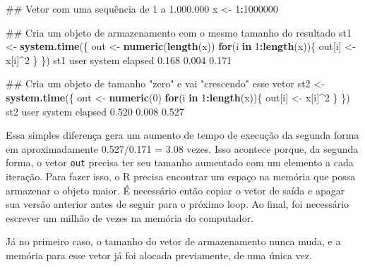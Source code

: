 \documentclass[10pt,a4paper]{book}
\newenvironment{Shaded}{\begin{snugshade}}{\end{snugshade}}
\newcommand{\KeywordTok}[1]{\textcolor[rgb]{0.13,0.29,0.53}{\textbf{#1}}}
\newcommand{\DecValTok}[1]{\textcolor[rgb]{0.00,0.00,0.81}{#1}}
\newcommand{\FloatTok}[1]{\textcolor[rgb]{0.00,0.00,0.81}{#1}}
\newcommand{\StringTok}[1]{\textcolor[rgb]{0.31,0.60,0.02}{#1}}
\newcommand{\ControlFlowTok}[1]{\textcolor[rgb]{0.13,0.29,0.53}{\textbf{#1}}}
\newcommand{\OperatorTok}[1]{\textcolor[rgb]{0.81,0.36,0.00}{\textbf{#1}}}
\newcommand{\NormalTok}[1]{#1}
\begin{document}
\begin{Shaded}
\begin{Highlighting}[]
\NormalTok{## Vetor com uma sequência de 1 a 1.000.000}
\NormalTok{x <-}\StringTok{ }\DecValTok{1}\OperatorTok{:}\DecValTok{1000000}

\NormalTok{## Cria um objeto de armazenamento com o mesmo tamanho do resultado}
\NormalTok{st1 <-}\StringTok{ }\KeywordTok{system.time}\NormalTok{(\{}
\NormalTok{    out <-}\StringTok{ }\KeywordTok{numeric}\NormalTok{(}\KeywordTok{length}\NormalTok{(x))}
    \ControlFlowTok{for}\NormalTok{(i }\ControlFlowTok{in} \DecValTok{1}\OperatorTok{:}\KeywordTok{length}\NormalTok{(x))\{}
\NormalTok{        out[i] <-}\StringTok{ }\NormalTok{x[i]}\OperatorTok{^}\DecValTok{2}
\NormalTok{    \}}
\NormalTok{\})}
\NormalTok{st1}
\NormalTok{   user  system elapsed }
  \FloatTok{0.168}   \FloatTok{0.004}   \FloatTok{0.171} 

\NormalTok{## Cria um objeto de tamanho "zero" e vai "crescendo" esse vetor}
\NormalTok{st2 <-}\StringTok{ }\KeywordTok{system.time}\NormalTok{(\{}
\NormalTok{    out <-}\StringTok{ }\KeywordTok{numeric}\NormalTok{(}\DecValTok{0}\NormalTok{)}
    \ControlFlowTok{for}\NormalTok{(i }\ControlFlowTok{in} \DecValTok{1}\OperatorTok{:}\KeywordTok{length}\NormalTok{(x))\{}
\NormalTok{        out[i] <-}\StringTok{ }\NormalTok{x[i]}\OperatorTok{^}\DecValTok{2}
\NormalTok{    \}}
\NormalTok{\})}
\NormalTok{st2}
\NormalTok{   user  system elapsed }
  \FloatTok{0.520}   \FloatTok{0.008}   \FloatTok{0.527} 
\end{Highlighting}
\end{Shaded}

Essa simples diferença gera um aumento de tempo de execução da segunda
forma em aproximadamente 0.527/0.171 = 3.08 vezes. Isso acontece porque,
da segunda forma, o vetor \texttt{out} precisa ter seu tamanho aumentado
com um elemento a cada iteração. Para fazer isso, o R precisa encontrar
um espaço na memória que possa armazenar o objeto maior. É necessário
então copiar o vetor de saída e apagar sua versão anterior antes de
seguir para o próximo loop. Ao final, foi necessário escrever um milhão
de vezes na memória do computador.

Já no primeiro caso, o tamanho do vetor de armazenamento nunca muda, e a
memória para esse vetor já foi alocada previamente, de uma única vez.
\end{document}
